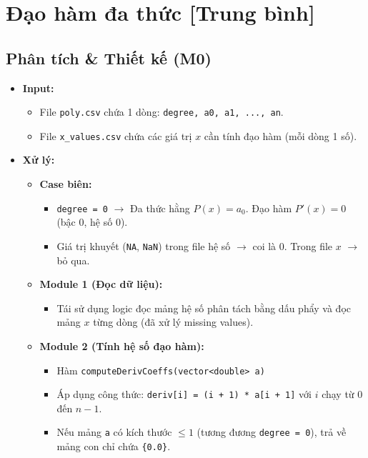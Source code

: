 \section{Đạo hàm đa thức [Trung bình]}
\subsection{Phân tích \& Thiết kế (M0)}
    \begin{itemize}
    \item \textbf{Input:}
        \begin{itemize}
            \item File \texttt{poly.csv} chứa 1 dòng: \texttt{degree, a0, a1, ..., an}.
            \item File \texttt{x\_values.csv} chứa các giá trị $x$ cần tính đạo hàm (mỗi dòng 1 số).
        \end{itemize}

    \item \textbf{Xử lý:}
        \begin{itemize}
            \item \textbf{Case biên:}
            \begin{itemize}
                \item \texttt{degree = 0} $\rightarrow$ Đa thức hằng $P(x) = a_0$. Đạo hàm $P'(x) = 0$ (bậc 0, hệ số 0).
                \item Giá trị khuyết (\texttt{NA}, \texttt{NaN}) trong file hệ số $\rightarrow$ coi là 0. Trong file $x$ $\rightarrow$ bỏ qua.
            \end{itemize}
            
            \item \textbf{Module 1 (Đọc dữ liệu):}
            \begin{itemize}
                \item Tái sử dụng logic đọc mảng hệ số phân tách bằng dấu phẩy và đọc mảng $x$ từng dòng (đã xử lý missing values).
            \end{itemize}

            \item \textbf{Module 2 (Tính hệ số đạo hàm):}
            \begin{itemize}
                \item Hàm \texttt{computeDerivCoeffs(vector<double> a)}
                \item Áp dụng công thức: \texttt{deriv[i] = (i + 1) * a[i + 1]} với $i$ chạy từ $0$ đến $n-1$.
                \item Nếu mảng \texttt{a} có kích thước $\le 1$ (tương đương \texttt{degree = 0}), trả về mảng con chỉ chứa \texttt{\{0.0\}}.
            \end{itemize}
            

\end{itemize}
\end{itemize}
